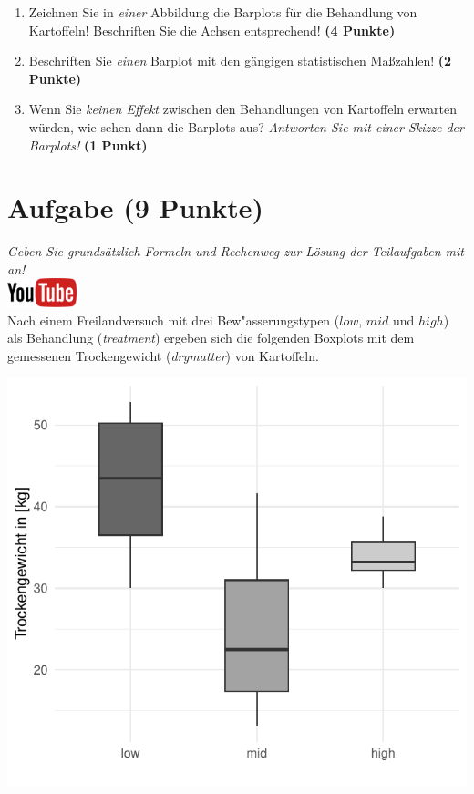\documentclass[a4paper, 9pt]{scrartcl}\usepackage[]{graphicx}\usepackage[]{xcolor}
\makeatletter
\def\maxwidth{ %
  \ifdim\Gin@nat@width>\linewidth
    \linewidth
  \else
    \Gin@nat@width
  \fi
}
\makeatother
\begin{document}
\begin{enumerate}
\item Zeichnen Sie in \textit{einer} Abbildung die Barplots f{\"u}r die
  Behandlung von Kartoffeln! Beschriften Sie die Achsen entsprechend!
  \textbf{(4 Punkte)}
\item Beschriften Sie \textit{einen} Barplot mit den g{\"a}ngigen
  statistischen Ma{\ss}zahlen! \textbf{(2 Punkte)}
\item Wenn Sie \textit{keinen Effekt} zwischen den Behandlungen von
  Kartoffeln erwarten w{\"u}rden, wie sehen dann die Barplots aus?
  \textit{Antworten Sie mit einer Skizze der Barplots!}
  \textbf{(1 Punkt)}
\end{enumerate} 
\clearpage

\section{Aufgabe \hfill (9 Punkte)}

\textit{Geben Sie grunds{\"a}tzlich Formeln und Rechenweg zur L{\"o}sung der
  Teilaufgaben mit an!} \\[1Ex]

\hfill\href{https://youtu.be/Xf0yE-o7bEU}{\includegraphics[width = 2cm]{img/youtube}}\\[1Ex] %



Nach einem Freilandversuch mit drei Bew{"a}sserungstypen ($low$, $mid$ und $high$) als Behandlung
(\textit{treatment}) ergeben sich die folgenden Boxplots mit dem
gemessenen Trockengewicht (\textit{drymatter}) von Kartoffeln.



{\centering \includegraphics[width=\maxwidth]{img/boxplot-02-zer-1} 

}
\end{document}
